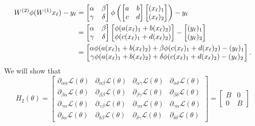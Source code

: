 \documentclass{article}
\begin{document}
\begin{align}
W^{(2)}\phi(W^{(1)}x_\ell)-y_\ell &= \begin{bmatrix}\alpha&\beta\\ \gamma&\delta\end{bmatrix}\phi\left(\begin{bmatrix}a&b\\c&d\end{bmatrix}\begin{bmatrix}(x_\ell)_1\\(x_\ell)_2\end{bmatrix}\right)-y_\ell \notag
\\ &= \begin{bmatrix}\alpha & \beta \\ \gamma & \delta\end{bmatrix} \begin{bmatrix}\phi(a(x_\ell)_1+b(x_\ell)_2) \\ \phi(c(x_\ell)_1+d(x_\ell)_2)\end{bmatrix}-\begin{bmatrix}(y_\ell)_1 \\ (y_\ell)_2\end{bmatrix} \notag
\\ &= \begin{bmatrix}\alpha\phi(a(x_\ell)_1+b(x_\ell)_2)+\beta\phi(c(x_\ell)_1+d(x_\ell)_2) - (y_\ell)_1\\ \gamma\phi(a(x_\ell)_1+b(x_\ell)_2)+\delta\phi(c(x_\ell)_1+d(x_\ell)_2) - (y_\ell)_2 \end{bmatrix}.\label{eq:blockexample}
\end{align}
We will show that
\begin{equation}
H_2(\theta)=\left[\begin{array}{cc|cc}
\partial_{\alpha\alpha}\mathcal{L}( \theta)&\partial_{\alpha\beta}\mathcal{L}(\theta)&\partial_{\alpha\gamma}\mathcal{L}(\theta)&\partial_{\alpha\delta}\mathcal{L}(\theta) \\ \partial_{\beta\alpha}\mathcal{L}(\theta)&\partial_{\beta\beta}\mathcal{L}(\theta)&\partial_{\beta\gamma}\mathcal{L}(\theta)&\partial_{\beta\delta}\mathcal{L}(\theta) \\ \hline
\partial_{\gamma\alpha}\mathcal{L}( \theta)&\partial_{\gamma\beta}\mathcal{L}( \theta)&\partial_{\gamma\alpha}\mathcal{L}( \theta)&\partial_{\gamma\alpha}\mathcal{L}( \theta) \\
\partial_{\delta\alpha}\mathcal{L}( \theta)&\partial_{\delta\beta}\mathcal{L}( \theta)&\partial_{\delta\gamma}\mathcal{L}( \theta)&\partial_{\delta\delta}\mathcal{L}(\theta)
\end{array}\right]=\begin{bmatrix}B&0\\0&B\end{bmatrix}
\end{equation}
\end{document}

